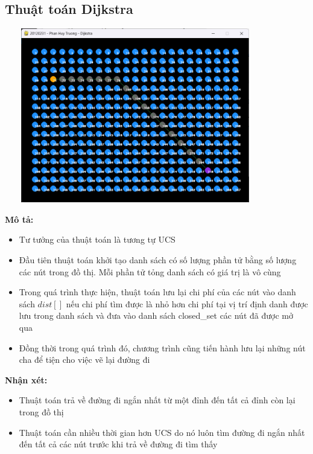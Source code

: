 \documentclass{article}
\begin{document}
\subsection{Thuật toán Dijkstra}
    \centerline{\includegraphics[width=4.5in, height=3in]{image/dijkstra_stimulation.png}}
    \vspace{2\baselineskip}
    \textbf{Mô tả: }
    \begin{itemize}
        \item Tư tưởng của thuật toán là tương tự UCS 
        \item Đầu tiên thuật toán khởi tạo danh sách có số lượng phần tử bằng số lượng các nút trong đồ thị. Mỗi phần tử tỏng danh sách có giá trị là vô cùng
        \item Trong quá trình thực hiện, thuật toán lưu lại chi phí của các nút vào danh sách $dist[]$ nếu chi phí tìm được là nhỏ hơn chi phí tại vị trí định danh được lưu trong danh sách và đưa vào danh sách closed\_set các nút đã được mở qua
        \item Đồng thời trong quá trình đó, chương trình cũng tiến hành lưu lại những nút cha để tiện cho việc vẽ lại đường đi
    \end{itemize}
    \textbf{Nhận xét: }
    \begin{itemize}
        \item Thuật toán trả về đường đi ngắn nhất từ một đỉnh đến tất cả đỉnh còn lại trong đồ thị
        \item Thuật toán cần nhiều thời gian hơn UCS do nó luôn tìm đường đi ngắn nhất đến tất cả các nút trước khi trả về đường đi tìm thấy
    \end{itemize}
\newpage
\end{document}
